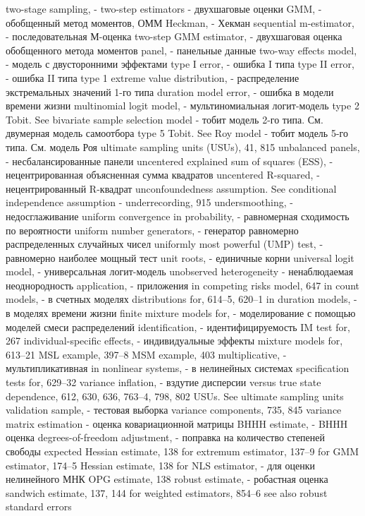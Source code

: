 two-stage sampling, - 
two-step estimators - двухшаговые оценки
GMM, - обобщенный метод моментов, ОММ
Heckman, - Хекман 
sequential m-estimator, - последовательная М-оценка
two-step GMM estimator, - двухшаговая оценка обобщенного метода моментов 
panel, - панельные данные
two-way effects model, - модель с двусторонними эффектами
type I error, - ошибка I типа
type II error, - ошибка II типа
type 1 extreme value distribution, - распределение экстремальных значений 1-го типа
duration model error, - ошибка в модели времени жизни
multinomial logit model, - мультиномиальная логит-модель
type 2 Tobit. See bivariate sample selection model - тобит модель 2-го типа. См. двумерная модель самоотбора
type 5 Tobit. See Roy model - тобит модель 5-го типа. См. модель Роя
ultimate sampling units (USUs), 41, 815 
unbalanced panels, - несбалансированные панели
uncentered explained sum of squares (ESS), - нецентрированная объясненная сумма квадратов 
uncentered R-squared, - нецентрированный R-квадрат
unconfoundedness assumption. See conditional independence assumption - 
underrecording, 915
undersmoothing, - недосглаживание
uniform convergence in probability, - равномерная сходимость по вероятности
uniform number generators, - генератор равномерно распределенных случайных чисел
uniformly most powerful (UMP) test, - равномерно наиболее мощный тест
unit roots, - единичные корни
universal logit model, - универсальная логит-модель
unobserved heterogeneity - ненаблюдаемая неоднородность
application, - приложения
in competing risks model, 647
in count models, - в счетных моделях
distributions for, 614–5, 620–1
in duration models, - в моделях времени жизни
finite mixture models for, - моделирование с помощью моделей смеси распределений
identification, - идентифицируемость
IM test for, 267
individual-specific effects, - индивидуальные эффекты
mixture models for, 613–21
MSL example, 397–8
MSM example, 403
multiplicative, - мультипликативная
in nonlinear systems, - в нелинейных системах
specification tests for, 629–32
variance inflation, - вздутие дисперсии
versus true state dependence, 612, 630, 636, 763–4,
798, 802
USUs. See ultimate sampling units
validation sample, - тестовая выборка
variance components, 735, 845
variance matrix estimation - оценка ковариационной матрицы
BHHH estimate, - BHHH оценка
degrees-of-freedom adjustment, - поправка на количество степеней свободы
expected Hessian estimate, 138 for extremum estimator, 137–9 for GMM estimator, 174–5 Hessian estimate, 138
for NLS estimator, - для оценки нелинейного МНК
OPG estimate, 138
robust estimate, - робастная оценка
sandwich estimate, 137, 144 for weighted estimators, 854–6 see also robust standard errors

